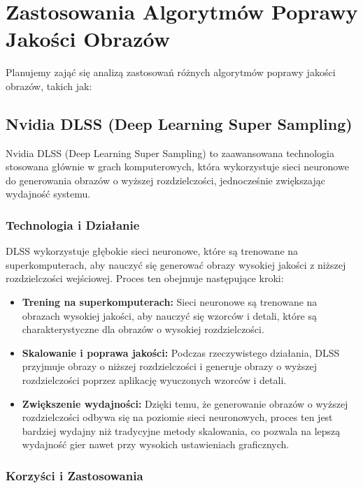 \documentclass[10pt]{article}
\begin{document}
\section*{Zastosowania Algorytmów Poprawy Jakości Obrazów}

Planujemy zająć się analizą zastosowań różnych algorytmów poprawy jakości obrazów, takich jak:

\subsection*{Nvidia DLSS (Deep Learning Super Sampling)}

Nvidia DLSS (Deep Learning Super Sampling) to zaawansowana technologia stosowana głównie w grach komputerowych, która wykorzystuje sieci neuronowe do generowania obrazów o wyższej rozdzielczości, jednocześnie zwiększając wydajność systemu.

\subsubsection*{Technologia i Działanie}

DLSS wykorzystuje głębokie sieci neuronowe, które są trenowane na superkomputerach, aby nauczyć się generować obrazy wysokiej jakości z niższej rozdzielczości wejściowej. Proces ten obejmuje następujące kroki:

\begin{itemize}
    \item \textbf{Trening na superkomputerach:} Sieci neuronowe są trenowane na obrazach wysokiej jakości, aby nauczyć się wzorców i detali, które są charakterystyczne dla obrazów o wysokiej rozdzielczości.
    \item \textbf{Skalowanie i poprawa jakości:} Podczas rzeczywistego działania, DLSS przyjmuje obrazy o niższej rozdzielczości i generuje obrazy o wyższej rozdzielczości poprzez aplikację wyuczonych wzorców i detali.
    \item \textbf{Zwiększenie wydajności:} Dzięki temu, że generowanie obrazów o wyższej rozdzielczości odbywa się na poziomie sieci neuronowych, proces ten jest bardziej wydajny niż tradycyjne metody skalowania, co pozwala na lepszą wydajność gier nawet przy wysokich ustawieniach graficznych.
\end{itemize}

\subsubsection*{Korzyści i Zastosowania}
\end{document}
